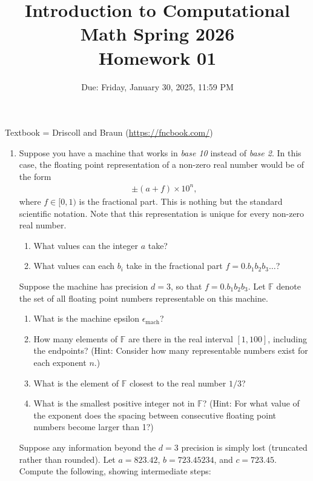 \documentclass[reqno, answers]{exam}
\title{Introduction to Computational Math Spring 2026 \\ Homework 01}
\date{Due: Friday, January 30, 2025, 11:59 PM}
\author{}
\begin{document}
\maketitle
\thispagestyle{empty}

Textbook = Driscoll and Braun (\url{https://fncbook.com/})

\begin{enumerate}

\item Suppose you have a machine that works in \textit{base 10} instead of \textit{base 2}. In this case, the floating point representation of a non-zero real number would be of the form
\begin{align*}
  \pm(a + f) \times 10^n,
\end{align*}
where $f \in [0, 1)$ is the fractional part. This is nothing but the standard scientific notation. Note that this representation is unique for every non-zero real number.

\begin{enumerate}
  \item What values can the integer $a$ take?
  \item What values can each $b_i$ take in the fractional part $f = 0.b_1 b_2 b_3 \ldots$?
\end{enumerate}

Suppose the machine has precision $d = 3$, so that $f = 0.b_1 b_2 b_3$. Let $\mathbb{F}$ denote the set of all floating point numbers representable on this machine.

\begin{enumerate}[resume]
  \item What is the machine epsilon $\epsilon_{\text{mach}}$?
  \item How many elements of $\mathbb{F}$ are there in the real interval $[1, 100]$, including the endpoints? (Hint: Consider how many representable numbers exist for each exponent $n$.)
  \item What is the element of $\mathbb{F}$ closest to the real number $1/3$? 
  \item What is the smallest positive integer not in $\mathbb{F}$? (Hint: For what value of the exponent does the spacing between consecutive floating point numbers become larger than 1?)
\end{enumerate}

Suppose any information beyond the $d=3$ precision is simply lost (truncated rather than rounded). Let $a = 823.42$, $b = 723.45234$, and $c = 723.45$. Compute the following, showing intermediate steps:


\end{enumerate}
\end{document}
